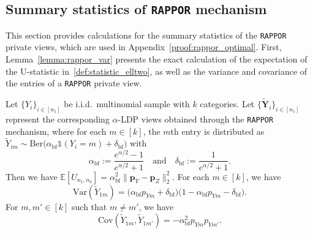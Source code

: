 \documentclass[twoside,11pt]{article}
\newcommand{\rvTwo}{Y}
\newcommand{\rvThree}{Z}
\newcommand{\vectorize}[1]{\mathbf{#1}}
\newcommand{\rvY}{Y}
\newcommand{\rVecY}{\vectorize{\rvY}}
\newcommand{\mE}{\mathbb{E}} %
\newcommand{\sampleIndexOne}{i}
\newcommand{\alphabetSize}{k} %
\newcommand{\vectorIndex}{m}
\newcommand{\sampleSize}{n}
\newcommand{\probVecElement}[2]{p_{{#1}{#2}}}
\newcommand{\probVec}{\mathbf{p}} %
\newcommand{\privacyParameter}{\alpha} %
\newcommand{\privacyParameterrappor}{\privacyParameter_{\mathrm{bf}}}
\newcommand{\smallNumber}{\delta}
\newcommand{\smallNumberrappor}{\smallNumber_{\mathrm{bf}}}
\begin{document}
\begin{appendix}
	\subsection{Summary statistics  of \texttt{RAPPOR} mechanism}\label{appendix:rappor_moment}
	This section provides calculations for the summary statistics of the \texttt{RAPPOR} private views, which are used in Appendix~\ref{proof:rappor_optimal}. First, Lemma~\ref{lemma:rappor_var} presents the exact calculation of the expectation of the U-statistic in~\eqref{def:statistic_elltwo}, as well as the variance and covariance of the entries of a \texttt{RAPPOR} private view.
	
	\begin{lemma}
		\label{lemma:rappor_var}
		Let $\{\rvTwo_\sampleIndexOne\}_{\sampleIndexOne \in [\sampleSize_1]}$  be i.i.d.~multinomial sample with $\alphabetSize$ categories. Let $\{\tilde{\rVecY}_i\}_{i \in [n_1]}$ represent the corresponding $\privacyParameter$-LDP views obtained through the \textnormal{\texttt{RAPPOR}} mechanism, where for each $m \in [k]$, the $m$th entry is distributed as 
		$
		\tilde{\rvTwo}_{\sampleIndexOne \vectorIndex}
		\sim
		\mathrm{Ber}
		\bigl(
		\privacyParameterrappor \mathds{1}
		(
		\rvTwo_{\sampleIndexOne} = \vectorIndex
		) + \smallNumberrappor
		\bigr)$ with
		\begin{equation*}
			\privacyParameterrappor := \frac{e^{\privacyParameter /2} -1}{e^{\privacyParameter /2} +1} \quad \text{and} \quad
			\smallNumberrappor := \frac{1}{e^{\privacyParameter /2} +1}.
		\end{equation*}
		Then we have $\mE[U_{\sampleSize_1, \sampleSize_2}]
		=
		\privacyParameterrappor^2 \|
		\probVec_\rvTwo - \probVec_\rvThree
		\|_2^2$.
		For each $\vectorIndex \in [\alphabetSize]$, we have 
		\begin{equation*}
			\mathrm{Var}(\tilde{Y}_{1\vectorIndex})
			=
			\bigl(
			\privacyParameterrappor 
			\probVecElement{\rvTwo}{\vectorIndex}
			+ \smallNumberrappor
			\bigr)
			\bigl(
			1
			-\privacyParameterrappor 
			\probVecElement{\rvTwo}{\vectorIndex}
			- \smallNumberrappor
			\bigr).
		\end{equation*}
		For $\vectorIndex,\vectorIndex' \in [\alphabetSize]$ such that $m \neq m'$, we have
		\begin{equation*}
			\mathrm{Cov}(\tilde{Y}_{1\vectorIndex}, \tilde{Y}_{1\vectorIndex'}) = -
			\privacyParameterrappor^2 \probVecElement{\rvTwo}{\vectorIndex} \probVecElement{\rvTwo}{\vectorIndex'}
			.
		\end{equation*}
		

\end{lemma}
\end{appendix}
\end{document}
